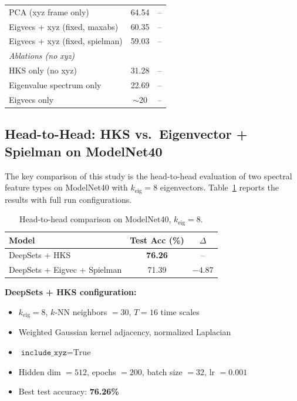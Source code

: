 \documentclass[11pt]{article}
\begin{document}
\begin{table}[ht]
\begin{tabular}{lcc}
\quad PCA (xyz frame only) & 64.54 & -- \\
\quad Eigvecs + xyz (fixed, maxabs) & 60.35 & -- \\
\quad Eigvecs + xyz (fixed, spielman) & 59.03 & -- \\
\midrule
\multicolumn{3}{l}{\emph{Ablations (no xyz)}} \\
\quad HKS only (no xyz) & 31.28 & -- \\
\quad Eigenvalue spectrum only & 22.69 & -- \\
\quad Eigvecs only & ${\sim}$20 & -- \\
\bottomrule
\end{tabular}
\end{table}

\subsection{Head-to-Head: HKS vs.\ Eigenvector + Spielman on ModelNet40}

The key comparison of this study is the head-to-head evaluation of two spectral feature
types on ModelNet40 with $k_{\text{eig}} = 8$ eigenvectors. Table~\ref{tab:head2head}
reports the results with full run configurations.

\begin{table}[ht]
\centering
\caption{Head-to-head comparison on ModelNet40, $k_{\text{eig}} = 8$.}
\label{tab:head2head}
\begin{tabular}{lcc}
\toprule
\textbf{Model} & \textbf{Test Acc (\%)} & $\Delta$ \\
\midrule
DeepSets + HKS & \textbf{76.26} & -- \\
DeepSets + Eigvec + Spielman & 71.39 & $-4.87$ \\
\bottomrule
\end{tabular}
\end{table}

\noindent\textbf{DeepSets + HKS configuration:}
\begin{itemize}[nosep]
    \item $k_{\text{eig}} = 8$, $k$-NN neighbors $= 30$, $T = 16$ time scales
    \item Weighted Gaussian kernel adjacency, normalized Laplacian
    \item $\texttt{include\_xyz} = \text{True}$
    \item Hidden dim $= 512$, epochs $= 200$, batch size $= 32$, lr $= 0.001$
    \item Best test accuracy: \textbf{76.26\%}
\end{itemize}
\end{document}
